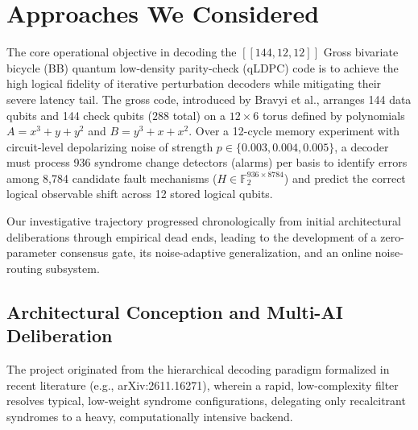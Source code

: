 \section{Approaches We Considered}

The core operational objective in decoding the $[[144, 12, 12]]$ Gross bivariate bicycle (BB) quantum low-density parity-check (qLDPC) code is to achieve the high logical fidelity of iterative perturbation decoders while mitigating their severe latency tail. The gross code, introduced by Bravyi et al., arranges 144 data qubits and 144 check qubits ($288$ total) on a $12 \times 6$ torus defined by polynomials $A = x^3 + y + y^2$ and $B = y^3 + x + x^2$. Over a 12-cycle memory experiment with circuit-level depolarizing noise of strength $p \in \{0.003, 0.004, 0.005\}$, a decoder must process 936 syndrome change detectors (alarms) per basis to identify errors among 8,784 candidate fault mechanisms ($H \in \mathbb{F}_2^{936 \times 8784}$) and predict the correct logical observable shift across 12 stored logical qubits.

Our investigative trajectory progressed chronologically from initial architectural deliberations through empirical dead ends, leading to the development of a zero-parameter consensus gate, its noise-adaptive generalization, and an online noise-routing subsystem.

\subsection{Architectural Conception and Multi-AI Deliberation}

The project originated from the hierarchical decoding paradigm formalized in recent literature (e.g., arXiv:2611.16271), wherein a rapid, low-complexity filter resolves typical, low-weight syndrome configurations, delegating only recalcitrant syndromes to a heavy, computationally intensive backend. 

